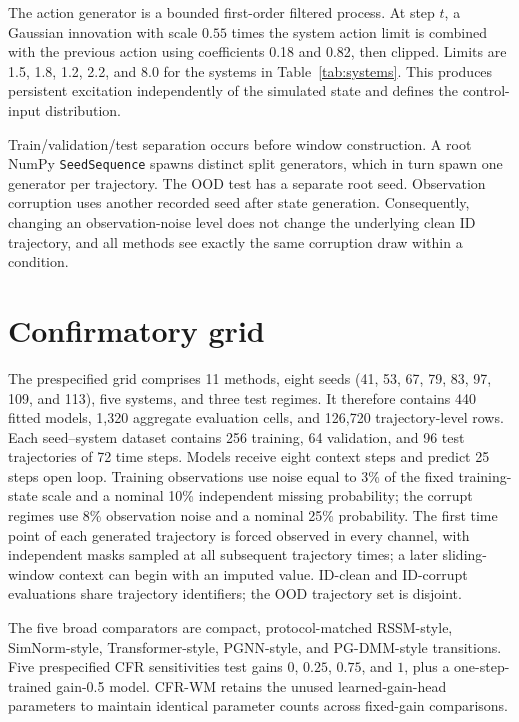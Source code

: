 The action generator is a bounded first-order filtered process. At step $t$, a Gaussian innovation with scale $0.55$ times the system action limit is combined with the previous action using coefficients 0.18 and 0.82, then clipped. Limits are 1.5, 1.8, 1.2, 2.2, and 8.0 for the systems in Table~\ref{tab:systems}. This produces persistent excitation independently of the simulated state and defines the control-input distribution.

Train/validation/test separation occurs before window construction. A root NumPy \texttt{SeedSequence} spawns distinct split generators, which in turn spawn one generator per trajectory. The OOD test has a separate root seed. Observation corruption uses another recorded seed after state generation. Consequently, changing an observation-noise level does not change the underlying clean ID trajectory, and all methods see exactly the same corruption draw within a condition.

\section{Confirmatory grid}

The prespecified grid comprises 11 methods, eight seeds (41, 53, 67, 79, 83, 97, 109, and 113), five systems, and three test regimes. It therefore contains 440 fitted models, 1,320 aggregate evaluation cells, and 126,720 trajectory-level rows. Each seed--system dataset contains 256 training, 64 validation, and 96 test trajectories of 72 time steps. Models receive eight context steps and predict 25 steps open loop. Training observations use noise equal to 3\% of the fixed training-state scale and a nominal 10\% independent missing probability; the corrupt regimes use 8\% observation noise and a nominal 25\% probability. The first time point of each generated trajectory is forced observed in every channel, with independent masks sampled at all subsequent trajectory times; a later sliding-window context can begin with an imputed value. ID-clean and ID-corrupt evaluations share trajectory identifiers; the OOD trajectory set is disjoint.

The five broad comparators are compact, protocol-matched RSSM-style,
SimNorm-style, Transformer-style, PGNN-style, and PG-DMM-style transitions. Five
prespecified CFR sensitivities test gains $0$, $0.25$, $0.75$, and $1$, plus a
one-step-trained gain-0.5 model. CFR-WM retains the unused learned-gain-head
parameters to maintain identical parameter counts across fixed-gain comparisons.

